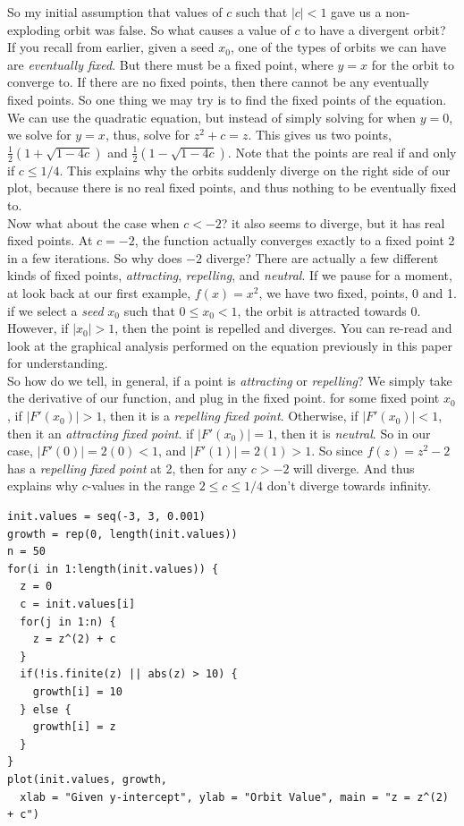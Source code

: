 \documentclass[20pt]{article} %
\begin{document}
So my initial assumption that values of $c$ such that $|c| < 1$ gave us a non-exploding orbit was false. So what causes a value of $c$ to have a divergent orbit?  If you recall from earlier, given a seed $x_0$, one of the types of orbits we can have are \textit{eventually fixed}. But there must be a fixed point, where $y=x$ for the orbit to converge to.  If there are no fixed points, then there cannot be any eventually fixed points.  So one thing we may try is to find the fixed points of the equation.  We can use the quadratic equation, but instead of simply solving for when $y=0$, we solve for $y=x$, thus, solve for $z^{2}+c=z$.  This gives us two points, $\frac{1}{2}(1+\sqrt{1-4c})$ and $\frac{1}{2}(1-\sqrt{1-4c})$.  Note that the points are real if and only if $c \leq 1/4$.  This explains why the orbits suddenly diverge on the right side of our plot, because there is no real fixed points, and thus nothing to be eventually fixed to. \\

\newpage
Now what about the case when $c < -2$? it also seems to diverge, but it has real fixed points. At $c = -2$, the function actually converges exactly to a fixed point 2 in a few iterations.  So why does $-2$ diverge? There are actually a few different kinds of fixed points, \textit{attracting}, \textit{repelling}, and \textit{neutral}.  If we pause for a moment, at look back at our first example, $f(x)=x^{2}$, we have two fixed, points, 0 and 1.  if we select a \textit{seed} $x_0$ such that $0 \leq x_0 < 1$, the orbit is attracted towards 0.  However, if $|x_0| > 1$, then the point is repelled and diverges.  You can re-read and look at the graphical analysis performed on the equation previously in this paper for understanding.  \\

So how do we tell, in general, if a point is \textit{attracting} or \textit{repelling}?  We simply take the derivative of our function, and plug in the fixed point. for some fixed point $x_0$, if $|F'(x_0)| > 1$, then it is a \textit{repelling fixed point}. Otherwise, if $|F'(x_0)| < 1$, then it an \textit{attracting fixed point}. if $|F'(x_0)| = 1$, then it is \textit{neutral}. So in our case, $|F'(0)| = 2(0) < 1$, and $|F'(1)| = 2(1) > 1$.  So since $f(z)=z^{2}-2$ has a \textit{repelling fixed point} at 2, then for any $c>-2$ will diverge. And thus explains why $c$-values in the range $2 \leq c \leq 1/4$ don't diverge towards infinity.




\newpage
\begin{verbatim}
init.values = seq(-3, 3, 0.001)
growth = rep(0, length(init.values))
n = 50
for(i in 1:length(init.values)) {
  z = 0
  c = init.values[i]
  for(j in 1:n) {
    z = z^(2) + c
  }
  if(!is.finite(z) || abs(z) > 10) {
    growth[i] = 10
  } else {
    growth[i] = z 
  }
}
plot(init.values, growth, 
  xlab = "Given y-intercept", ylab = "Orbit Value", main = "z = z^(2) + c")
\end{verbatim}
\end{document}
